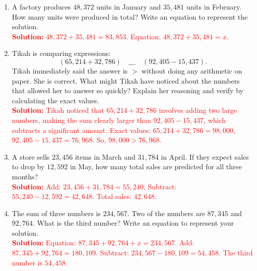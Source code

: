 \documentclass[12pt]{article}
\begin{document}
\vspace{1em}

\begin{tcolorbox}[colframe=black!60, colback=white, 
coltitle=black, colbacktitle=black!15, fonttitle=\bfseries\Large, 
title=Problems, halign title=center, left=10pt, right=10pt, top=10pt, bottom=60pt]
\begin{enumerate}[start=9, itemsep=3em]
    \item A factory produces \( 48,372 \) units in January and \( 35,481 \) units in February. How many units were produced in total? Write an equation to represent the solution.\\
    \textcolor{red}{\textbf{Solution:} \( 48,372 + 35,481 = 83,853 \). Equation: \( 48,372 + 35,481 = x \).}

    \item Tikah is comparing expressions: 
    \[
    (65,214 + 32,786) \quad \_\_\_ \quad (92,405 - 15,437).
    \]
    Tikah immediately said the answer is \( > \) without doing any arithmetic on paper. She is correct. What might Tikah have noticed about the numbers that allowed her to answer so quickly? Explain her reasoning and verify by calculating the exact values.\\
    \textcolor{red}{\textbf{Solution:} Tikah noticed that \( 65,214 + 32,786 \) involves adding two large numbers, making the sum clearly larger than \( 92,405 - 15,437 \), which subtracts a significant amount. Exact values: \( 65,214 + 32,786 = 98,000 \), \( 92,405 - 15,437 = 76,968 \). So, \( 98,000 > 76,968 \).}

    \item A store sells \( 23,456 \) items in March and \( 31,784 \) in April. If they expect sales to drop by \( 12,592 \) in May, how many total sales are predicted for all three months?\\
    \textcolor{red}{\textbf{Solution:} Add: \( 23,456 + 31,784 = 55,240 \). Subtract: \( 55,240 - 12,592 = 42,648 \). Total sales: \( 42,648 \).}

    \item The sum of three numbers is \( 234,567 \). Two of the numbers are \( 87,345 \) and \( 92,764 \). What is the third number? Write an equation to represent your solution.\\
    \textcolor{red}{\textbf{Solution:} Equation: \( 87,345 + 92,764 + x = 234,567 \). Add: \( 87,345 + 92,764 = 180,109 \). Subtract: \( 234,567 - 180,109 = 54,458 \). The third number is \( 54,458 \).}
\end{enumerate}
\end{tcolorbox}
\end{document}
